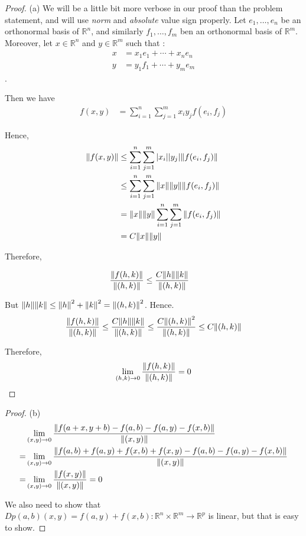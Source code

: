 \documentclass[12pt]{book}
\begin{document}
\begin{proof}
  (a) We will be a little bit more verbose in our proof than the problem
  statement, and will use \emph{norm} and \emph{absolute} value sign
  properly. Let $e_1, \ldots, e_n$ be an orthonormal basis of $\mathbb{R}^n$,
  and similarly $f_1, \ldots, f_m$ ben an orthonormal basis of
  $\mathbb{R}^m$. Moreover, let $x \in \mathbb{R}^n$ and $y \in \mathbb{R}^m$
  such that :
  \begin{align*}
    x& = x_1 e_1 + \cdots + x_n e_n\\
    y& = y_1 f_1 + \cdots + y_m e_m
  \end{align*}.

  Then we have
  \begin{align*}
    f(x,y) & = \sum_{i=1}^n \sum_{j=1}^m x_i y_j f(e_i, f_j)
  \end{align*}

  Hence,
    \begin{align*}
      \norm{f(x,y)} & \le \sum_{i=1}^n \sum_{j=1}^m \abs{x_i} \abs{y_j} \norm{f(e_i, f_j)}\\
      & \le \sum_{i=1}^n \sum_{j=1}^m \norm{x} \norm{y} \norm{f(e_i, f_j)}\\
      & = \norm{x} \norm{y} \sum_{i=1}^n \sum_{j=1}^m  \norm{f(e_i, f_j)}\\
      & = C \norm{x} \norm{y}
    \end{align*}

    Therefore,

    \begin{align*}
      \frac{\norm{f(h,k)}}{\norm{(h,k)}} & \le \frac{C \norm{h} \norm{k}}{\norm{(h,k)}}
    \end{align*}

    But $\norm{h} \norm{k} \le \norm{h}^2 + \norm{k}^2 = {\norm{(h,k)}}^2$. Hence.
    \[
      \frac{\norm{f(h,k)}}{\norm{(h,k)}} \le \frac{C \norm{h} \norm{k}}{\norm{(h,k)}} \le \frac{C \norm{(h,k)}^2}{\norm{(h,k)}} \le C \norm{(h,k)}
      \]

    Therefore,
    \[
    \lim_{(h,k) \to 0} \frac{\norm{f(h,k)}}{\norm{(h,k)}} = 0
    \]
\end{proof}

\begin{proof}
  (b) \begin{align*}
    & \lim_{(x,y) \to 0}\frac{\norm{f(a+x, y+b) - f(a,b) - f(a,y) - f(x,b)}}{\norm{(x,y)}}\\
    = & \lim_{(x,y) \to 0}\frac{\norm{f(a,b) + f(a,y) + f(x,b) + f(x,y) - f(a,b) - f(a,y) - f(x,b)}}{\norm{(x,y)}}\\
    = & \lim_{(x,y) \to 0}\frac{\norm{f(x,y)}}{\norm{(x,y)}} = 0\\
  \end{align*}

  We also need to show that $Dp(a,b)(x,y) = f(a,y) + f(x,b) : \mathbb{R}^n \times \mathbb{R}^m \to \mathbb{R}^p$ is linear, but that is easy to show. 
\end{proof}
\end{document}
